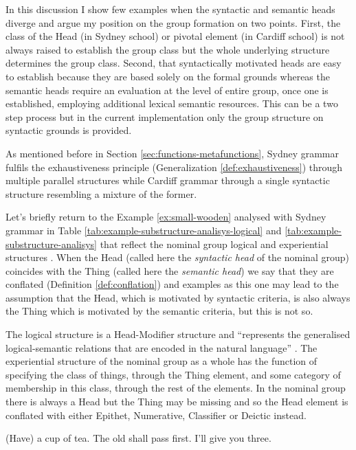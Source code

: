 In this discussion I show few examples when the syntactic and semantic heads diverge and argue my position on the group formation on two points. First, the class of the Head (in Sydney school) or pivotal element (in Cardiff school) is not always raised to establish the group class but the whole underlying structure determines the group class. Second, that syntactically motivated heads are easy to establish because they are based solely on the formal grounds whereas the semantic heads require an evaluation at the level of entire group, once one is established, employing additional lexical semantic resources. This can be a two step process but in the current implementation only the group structure on syntactic grounds is provided. 

As mentioned before in Section \ref{sec:functions-metafunctions}, Sydney grammar fulfils the exhaustiveness principle (Generalization \ref{def:exhaustiveness}) through multiple parallel structures while Cardiff grammar through a single syntactic structure resembling a mixture of the former.

Let's briefly return to the Example \ref{ex:small-wooden} analysed with Sydney grammar in Table \ref{tab:example-substructure-analisys-logical} and \ref{tab:example-substructure-analisys} that reflect the nominal group logical and experiential structures \citet[391]{Halliday2013}. When the Head (called here the \textit{syntactic head} of the nominal group) coincides with the Thing (called here the \textit{semantic head}) we say that they are conflated (Definition \ref{def:conflation}) and examples as this one may lead to the assumption that the Head, which is motivated by syntactic criteria, is also always the Thing which is motivated by the semantic criteria, but this is not so.

The logical structure is a Head-Modifier structure and ``represents the generalised logical-semantic relations that are encoded in the natural language'' \citep[388]{Halliday2013}. The experiential structure of the nominal group as a whole has the function of specifying the class of things, through the Thing element, and some category of membership in this class, through the rest of the elements. In the nominal group there is always a Head but the Thing may be missing and so the Head element is conflated with either Epithet, Numerative, Classifier or Deictic instead.

\begin{exe}
	\ex\label{ex:one} (Have) a cup of tea. 
   	\ex\label{ex:the-old-example} The old shall pass first.
	\ex\label{ex:three} I'll give you three.
\end{exe}


